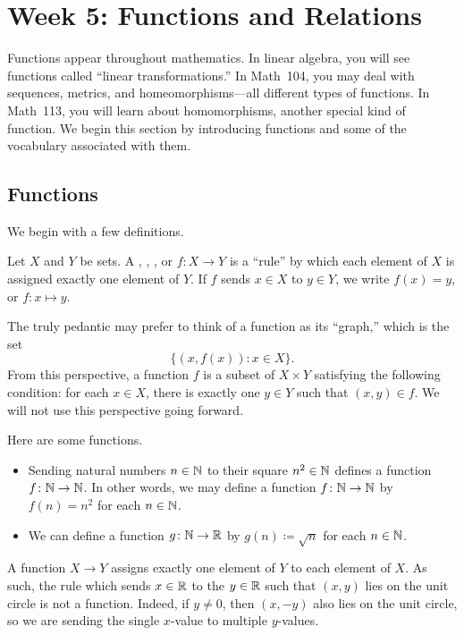 \documentclass[../main.tex]{subfiles}
\begin{document}
\section{Week 5: Functions and Relations} \label{sec:relations}
Functions appear throughout mathematics. In linear algebra, you will see functions called ``linear transformations.'' In Math~104, you may deal with sequences, metrics, and homeomorphisms---all different types of functions. In Math~113, you will learn about homomorphisms, another special kind of function. We begin this section by introducing functions and some of the vocabulary associated with them.

\subsection{Functions}
We begin with a few definitions.
\begin{definition}[function]
    Let $X$ and $Y$ be sets. A , , , or  $f\colon X \to Y$ is a ``rule'' by which each element of $X$ is assigned exactly one element of $Y$. If $f$ sends $x \in X$ to $y\in Y$, we write $f(x) = y$, or $f\colon x \mapsto y$.
\end{definition}
\begin{remark}
    The truly pedantic may prefer to think of a function as its ``graph,'' which is the set
    \[\{(x,f(x)):x\in X\}.\]
    From this perspective, a function $f$ is a subset of $X\times Y$ satisfying the following condition: for each $x\in X$, there is exactly one $y\in Y$ such that $(x,y)\in f$. We will not use this perspective going forward.
\end{remark}
\begin{example}
    Here are some functions.
    \begin{itemize}
        \item Sending natural numbers $n\in\mathbb N$ to their square $n^2\in\mathbb N$ defines a function $f\colon\mathbb N\to\mathbb N$. In other words, we may define a function $f\colon\mathbb N\to\mathbb N$ by $f(n)=n^2$ for each $n\in\mathbb N$.
        \item We can define a function $g\colon\mathbb N\to\mathbb R$ by $g(n)\coloneqq\sqrt n$ for each $n\in\mathbb N$.
    \end{itemize}
\end{example}
\begin{nex}
    A function $X \to Y$ assigns exactly one element of $Y$ to each element of $X$. As such, the rule which sends $x \in \mathbb R$ to the $y \in \mathbb R$ such that $(x, y)$ lies on the unit circle is not a function. Indeed, if $y \neq 0$, then $(x, -y)$ also lies on the unit circle, so we are sending the single $x$-value to multiple $y$-values.
\end{nex}
\end{document}
